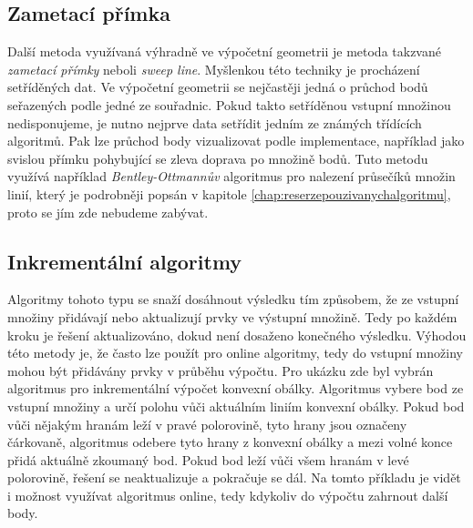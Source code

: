 \subsection{Zametací přímka}
	Další metoda využívaná výhradně ve výpočetní geometrii je metoda takzvané \textit{zametací přímky} neboli \textit{sweep line}. Myšlenkou této techniky je procházení setříděných dat. Ve výpočetní geometrii se nejčastěji jedná o průchod bodů seřazených podle jedné ze souřadnic. Pokud takto setříděnou vstupní množinou nedisponujeme, je nutno nejprve data setřídit jedním ze známých třídících algoritmů. Pak lze průchod body vizualizovat podle implementace, například jako svislou přímku pohybující se zleva doprava po množině bodů.
	Tuto metodu využívá například \textit{Bentley-Ottmannův} algoritmus pro nalezení průsečíků množin linií, který je podrobněji popsán v kapitole \ref{chap:reserzepouzivanychalgoritmu}, proto se jím zde nebudeme zabývat.

\subsection{Inkrementální algoritmy}
	Algoritmy tohoto typu se snaží dosáhnout výsledku tím způsobem, že ze vstupní množiny přidávají nebo aktualizují prvky ve výstupní množině. Tedy po každém kroku je řešení aktualizováno, dokud není dosaženo konečného výsledku. Výhodou této metody je, že často lze použít pro online algoritmy, tedy do vstupní množiny mohou být přidávány prvky v průběhu výpočtu.
	Pro ukázku zde byl vybrán algoritmus pro inkrementální výpočet konvexní obálky. Algoritmus vybere bod ze vstupní množiny a určí polohu vůči aktuálním liniím konvexní obálky. Pokud bod vůči nějakým hranám leží v pravé polorovině, tyto hrany jsou označeny čárkovaně, algoritmus odebere tyto hrany z konvexní obálky a mezi volné konce přidá aktuálně zkoumaný bod. Pokud bod leží vůči všem hranám v levé polorovině, řešení se neaktualizuje a pokračuje se dál. Na tomto příkladu je vidět i možnost využívat algoritmus online, tedy kdykoliv do výpočtu zahrnout další body.

